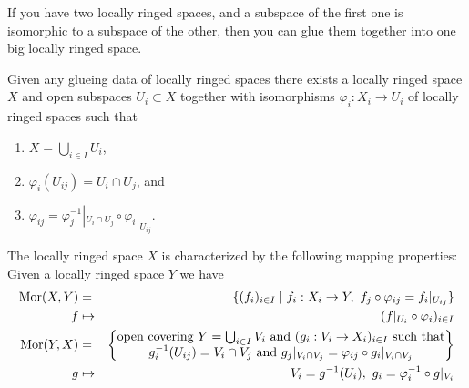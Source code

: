\begin{lemma}
\label{lemma-glue}
\begin{reference}
\cite[Chapter II, \S 1, no. 34, Proposition 8, p. 227]{FAC}
\end{reference}
\begin{slogan}
If you have two locally ringed spaces, and a subspace of the first one
is isomorphic to a subspace of the other, then you can glue them together
into one big locally ringed space.
\end{slogan}
Given any glueing data of locally ringed spaces there
exists a locally ringed space $X$ and open subspaces
$U_i \subset X$ together with isomorphisms
$\varphi_i : X_i \to U_i$ of locally ringed spaces such that
\begin{enumerate}
\item $X=\bigcup_{i\in I} U_i$,
\item $\varphi_i(U_{ij}) = U_i \cap U_j$, and
\item $\varphi_{ij} =
\varphi_j^{-1}|_{U_i \cap U_j} \circ \varphi_i|_{U_{ij}}$.
\end{enumerate}
The locally ringed space $X$ is characterized by the following
mapping properties: Given a locally ringed space $Y$ we have
\begin{eqnarray*}
\mathop{\mathrm{Mor}}\nolimits(X, Y) & = & \{ (f_i)_{i\in I} \mid
f_i : X_i \to Y, \ f_j \circ \varphi_{ij} = f_i|_{U_{ij}}\} \\
f & \mapsto & (f|_{U_i} \circ \varphi_i)_{i \in I} \\
\mathop{\mathrm{Mor}}\nolimits(Y, X) & = &
\left\{
\begin{matrix}
\text{open covering }Y = \bigcup\nolimits_{i \in I} V_i\text{ and }
(g_i : V_i \to X_i)_{i \in I}
\text{ such that}\\
g_i^{-1}(U_{ij}) = V_i \cap V_j
\text{ and }
g_j|_{V_i \cap V_j} = \varphi_{ij} \circ g_i|_{V_i \cap V_j}
\end{matrix}
\right\} \\
g & \mapsto &
V_i = g^{-1}(U_i), \ g_i = \varphi_i^{-1} \circ g|_{V_i}
\end{eqnarray*}
\end{lemma}


